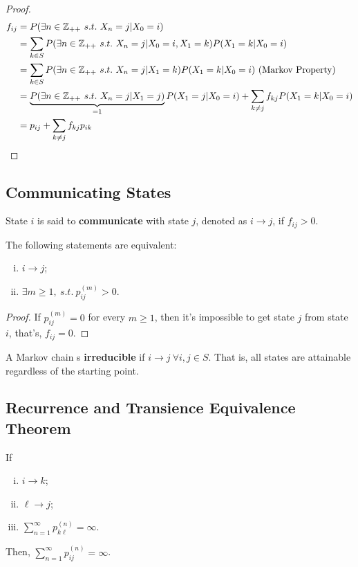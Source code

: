\documentclass{article}
\newcommand{\upn}[0]{^{(n)}}
\begin{document}
    \begin{proof}
    	\begin{align}
	    	f_{ij} &= P(\exists n \in \mathbb{Z}_{++} \ s.t.\ X_n = j|X_0 = i) \\
	    	&= \sum_{k \in S} P(\exists n \in \mathbb{Z}_{++} \ s.t.\ X_n = j|X_0 = i, X_1 = k) P(X_1=k|X_0=i) \\
	    	&= \sum_{k \in S} P(\exists n \in \mathbb{Z}_{++} \ s.t.\ X_n = j| X_1 = k) P(X_1=k|X_0=i) \text{{ (Markov Property)}} \\
	    	&= \underbrace{P(\exists n \in \mathbb{Z}_{++} \ s.t.\ X_n = j| X_1 = j)}_{=1} P(X_1=j|X_0=i)
	    	+ \sum_{k \neq j} f_{kj} P(X_1=k|X_0=i) \\
	    	&= p_{ij} + \sum_{k \neq j} f_{kj} p_{ik}
    	\end{align}
    \end{proof}

	\subsection{Communicating States}

    \begin{definition}
    	State $i$ is said to \textbf{communicate} with state $j$, denoted as $i \to j$, if $f_{ij} > 0$.
    \end{definition}
    
    \begin{proposition}
    	The following statements are equivalent:
    	\begin{enumerate}[(i)]
    		\item $i \to j$;
    		\item $\exists m \geq 1,\ s.t.\ p_{ij}^{(m)} > 0$.
    	\end{enumerate}
    \end{proposition}
    
    \begin{proof}
    	If $p^{(m)}_{ij} = 0$ for every $m \geq 1$, then it's impossible to get state $j$ from state $i$, that's, $f_{ij} = 0$.
    \end{proof}
    
    \begin{definition}
    	A Markov chain s \textbf{irreducible} if $i \to j\ \forall i,j \in S$. That is, all states are attainable regardless of the starting point.
    \end{definition}
    
    
    \subsection{Recurrence and Transience Equivalence Theorem}
    \begin{theorem}
    	If
    	\begin{enumerate}[(i)]
    		\item $i \to k$;
    		\item $\ell \to j$;
    		\item $\sum_{n=1}^\infty p_{k \ell}\upn = \infty$.
    	\end{enumerate}
    	Then, $\sum_{n=1}^\infty p_{ij}\upn = \infty$.
    \end{theorem}
    
\end{document}
